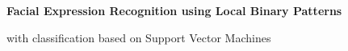 %
%
%
%
\begin{titlepage}

   \vspace*{\fill}

   \noindent \colorbox{aaublue}{\parbox{\textwidth}{%
   \color{white}%
       \begin{center}
    \Huge{\textbf{
      Facial Expression Recognition using Local Binary Patterns%
    }}
    \end{center}
    \begin{center}
      \Large{
        with classification based on Support Vector Machines%
      }
    \end{center}
}}

    \vfill
    

\end{titlepage}
